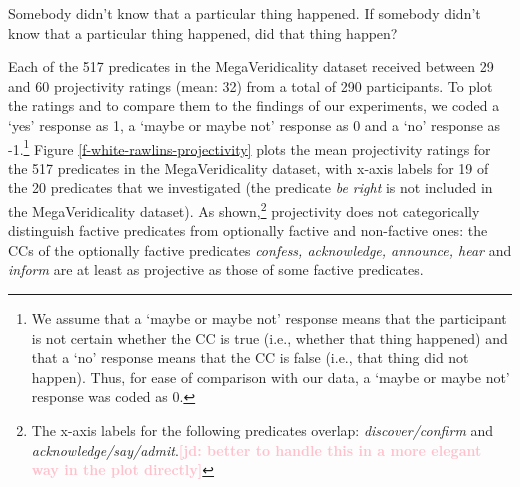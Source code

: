 \documentclass[11pt,fleqn]{article}
\newcommand{\jd}[1]{\textbf{\textcolor{Pink}{[jd: #1]}}}
\newcommand{\6}{\mbox{$[\hspace*{-.6mm}[$}}
\newcommand{\9}{\mbox{$]\hspace*{-.6mm}]$}}
\begin{document}
\begin{exe}
\ex\label{wr-stim-proj}
\begin{xlist}
\ex Somebody didn't know that a particular thing happened.
\ex If somebody didn't know that a particular thing happened, did that thing happen?
\end{xlist}
\end{exe}

Each of the 517 predicates in the MegaVeridicality dataset received between 29 and 60 projectivity ratings (mean: 32) from a total of 290 participants. To plot the ratings and to compare them to the findings of our experiments, we coded a `yes' response as 1,  a `maybe or maybe not' response as 0 and a `no' response as -1.\footnote{We assume that a `maybe or maybe not' response means that the participant is not certain whether the CC is true (i.e., whether that thing happened) and that a `no' response means that the CC is false (i.e., that thing did not happen). Thus, for ease of comparison with our data, a `maybe or maybe not' response was coded as 0.} Figure \ref{f-white-rawlins-projectivity} plots the mean projectivity ratings for the 517 predicates in the MegaVeridicality dataset, with x-axis labels for 19 of the 20 predicates that we investigated (the predicate {\em be right} is not included in the MegaVeridicality dataset). As shown,\footnote{The x-axis labels for the following predicates overlap: {\em discover/confirm} and {\em acknowledge/say/admit}.\jd{better to handle this in a more elegant way in the plot directly}} projectivity does not categorically distinguish factive predicates from optionally factive and non-factive ones: the CCs of the optionally factive predicates {\em confess, acknowledge, announce, hear} and {\em inform} are at least as projective as those of some factive predicates. 
\end{document}
